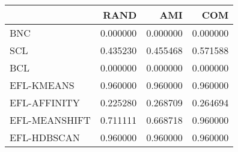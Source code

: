 \begin{tabular}{lrrr}
\toprule
 & RAND & AMI & COM \\
\midrule
BNC & 0.000000 & 0.000000 & 0.000000 \\
SCL & 0.435230 & 0.455468 & 0.571588 \\
BCL & 0.000000 & 0.000000 & 0.000000 \\
EFL-KMEANS & 0.960000 & 0.960000 & 0.960000 \\
EFL-AFFINITY & 0.225280 & 0.268709 & 0.264694 \\
EFL-MEANSHIFT & 0.711111 & 0.668718 & 0.960000 \\
EFL-HDBSCAN & 0.960000 & 0.960000 & 0.960000 \\
\bottomrule
\end{tabular}
